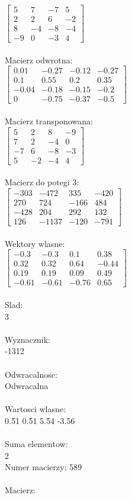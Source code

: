 \documentclass[a4paper,12pt]{article}
\begin{document}
$\begin{bmatrix} 5&7&-7&5\\2&2&6&-2\\8&-4&-8&-4\\-9&0&-3&4 \end{bmatrix}$
\\
\\
Macierz odwrotna:\\

$\begin{bmatrix} 0.01&-0.27&-0.12&-0.27\\0.1&0.55&0.2&0.35\\-0.04&-0.18&-0.15&-0.2\\0&-0.75&-0.37&-0.5 \end{bmatrix}$
\\
\\
Macierz transponowana:\\

$\begin{bmatrix} 5&2&8&-9\\7&2&-4&0\\-7&6&-8&-3\\5&-2&-4&4 \end{bmatrix}$
\\
\\
Macierz do potegi 3:\\

$\begin{bmatrix} -303&-472&335&-420\\270&724&-166&484\\-428&204&292&132\\126&-1137&-120&-791 \end{bmatrix}$
\\
\\
Wektory wlasne:\\

$\begin{bmatrix} -0.3&-0.3&0.1&0.38\\0.32&0.32&0.64&-0.44\\0.19&0.19&0.09&0.49\\-0.61&-0.61&-0.76&0.65 \end{bmatrix}$
\\
\\
Slad:\\
3
\\
\\
Wyznacznik:\\
-1312
\\
\\
Odwracalnosc:\\
Odwracalna
\\
\\
Wartosci wlasne:\\
0.51 0.51 5.54 -3.56
\\
\\
Suma elementow:\\
2
\\
\newpage
Numer macierzy:
589
\\
\\
Macierz:\\
\end{document}
